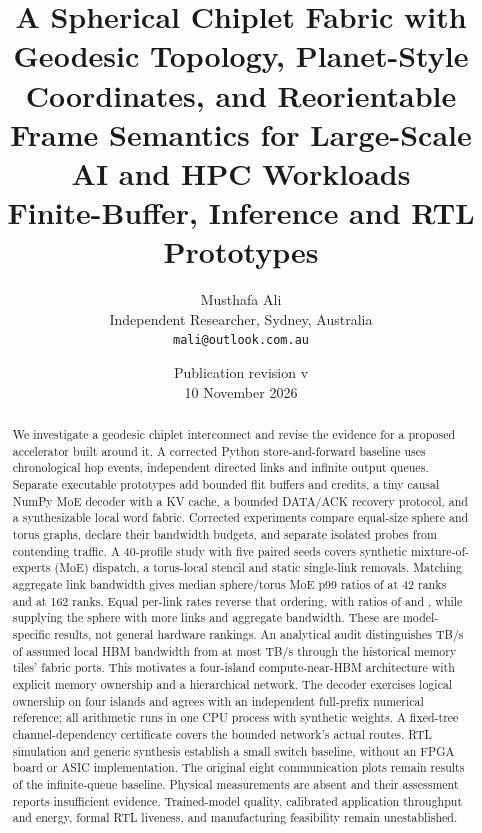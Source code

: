 \documentclass[11pt,a4paper]{article}
\title{\bfseries A Spherical Chiplet Fabric with Geodesic Topology,\newline
Planet-Style Coordinates, and Reorientable Frame Semantics\newline
for Large-Scale AI and HPC Workloads\\[8pt]
\large Finite-Buffer, Inference and RTL Prototypes}
\author{Musthafa Ali\\
\normalsize Independent Researcher, Sydney, Australia\\
\normalsize\texttt{mali@outlook.com.au}}
\date{Publication revision v\PrototypeVersion\\10 November 2026}
\begin{document}
\maketitle

\begin{abstract}
We investigate a geodesic chiplet interconnect and revise the evidence for a
proposed accelerator built around it. A corrected Python store-and-forward
baseline uses chronological hop events, independent directed links and
infinite output queues. Separate executable prototypes add bounded flit
buffers and credits, a tiny causal NumPy MoE decoder with a KV cache, a bounded
DATA/ACK recovery protocol, and a synthesizable local word fabric.
Corrected experiments compare equal-size sphere and torus graphs, declare
their bandwidth budgets, and separate isolated probes from contending
traffic. A 40-profile study with five paired seeds covers synthetic
mixture-of-experts (MoE) dispatch, a torus-local stencil and static single-link
removals. Matching aggregate link bandwidth gives median sphere/torus MoE p99
ratios of \MoeFortyTwoEqualTotalRatio{} at 42 ranks and
\MoeOneSixtyTwoEqualTotalRatio{} at 162 ranks. Equal per-link rates reverse
that ordering, with ratios of \MoeFortyTwoPerLinkRatio{} and
\MoeOneSixtyTwoPerLinkRatio{}, while supplying the sphere with more links
and aggregate bandwidth. These are model-specific results, not general
hardware rankings. An analytical audit distinguishes \LocalHbmTbps{} TB/s
of assumed local HBM bandwidth from at most \RemoteHbmTbps{} TB/s through
the historical memory tiles' fabric ports. This motivates a four-island
compute-near-HBM architecture with explicit memory ownership and a
hierarchical network. The decoder exercises logical ownership on four islands
and agrees with an independent full-prefix numerical reference; all arithmetic
runs in one CPU process with synthetic weights. A fixed-tree channel-dependency
certificate covers the bounded network's actual routes. RTL simulation and
generic synthesis establish a small switch baseline, without an FPGA board or
ASIC implementation. The original eight communication plots remain results of
the infinite-queue baseline. Physical measurements are absent and their
assessment reports insufficient evidence. Trained-model quality, calibrated
application throughput and energy, formal RTL liveness, and manufacturing
feasibility remain unestablished.
\end{abstract}

\noindent{}
\end{document}
